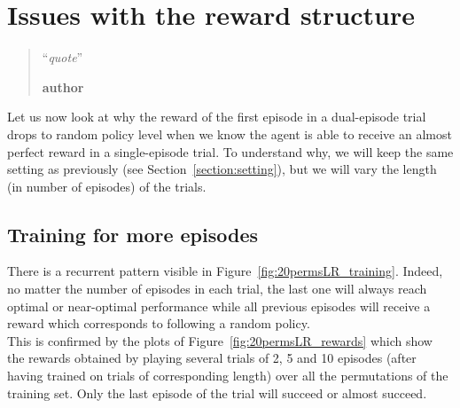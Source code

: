 \chapter{Issues with the reward structure}
\label{chap:reward_structure}
\begin{quotation}
\noindent ``\emph{quote}''
\begin{flushright}\textbf{author}\end{flushright}
\end{quotation}

Let us now look at why the reward of the first episode in a dual-episode
trial drops to random policy level when we know the agent is able to receive
an almost perfect reward in a single-episode trial. To understand why, we will
keep the same setting as previously (see Section~\ref{section:setting}), but
we will vary the length (in number of episodes) of the trials.

\section{Training for more episodes}
There is a recurrent pattern visible in Figure~\ref{fig:20permsLR_training}.
Indeed, no matter the number of episodes in each trial, the last one will
always reach optimal or near-optimal performance while all previous episodes
will receive a reward which corresponds to following a random policy.\\

This is confirmed by the plots of Figure~\ref{fig:20permsLR_rewards} which
show the rewards obtained by playing several trials of 2, 5 and 10 episodes
(after having trained on trials of corresponding length) over all the
permutations of the training set. Only the last episode of the trial will
succeed or almost succeed.

